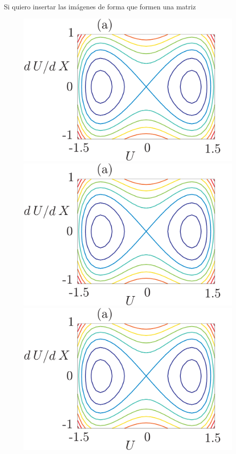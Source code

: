 \documentclass{article}
\begin{document}
Si quiero insertar las imágenes de forma que formen una matriz \smallskip
\begin{figure} %
\begin{center}
\includegraphics[scale=0.25]{figura1}
\includegraphics[scale=0.25]{figura1}\\
\includegraphics[scale=0.25]{figura1}

\end{center}
\end{figure}
\end{document}
